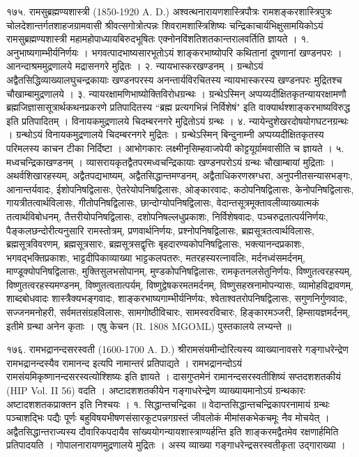 १७५. रामसुब्रह्मण्यशास्त्री (1850-1920 A. D.)
अश्वत्थनारायणशास्त्रिपौत्रः रामशङ्करशास्त्रिपुत्रः चोलदेशान्तर्गतशाहजग्रामवासी श्रीवत्सगोत्रोत्पन्नः शिवरामशास्त्रिशिष्यः चन्द्रिकाचार्यभिक्षुसामयिकोऽयं रामसुब्रह्मण्यशास्त्री महामहोपाध्यायबिरुदभूषितः एक्नोनविंशतिशतकान्तरालवर्तिति ज्ञायते ।
१. अनुभाष्यगाम्भीर्यनिर्णयः । भगवत्पादभाष्यसारभूतोऽयं शाङ्करभाष्योपरि कथितानां दूषणानां खण्डनपरः । आनन्दाश्रममुद्रणालये मद्रासनगरे मुद्रितः ।
२. न्यायभास्करखण्डनम् । ग्रन्थोऽयं अद्वैतसिद्धिव्याख्यालघुचन्द्रकायाः खण्डनपरस्य अनन्तार्यविरचितस्य न्यायभास्करस्य खण्डनपरः मुद्रितश्च चौखाम्बामुद्रणालये ।
३. न्यायरक्षामणिभाष्योक्तिविरोधग्रन्थः । ग्रन्थेऽस्मिन् अप्पय्यदीक्षितकृतन्यायरक्षामणौ ब्रह्मजिज्ञासासूत्रार्थकथनप्रकरणे प्रतिपादितस्य ``ब्रह्म प्रत्यगभिन्नं निर्विशेषं" इति वाक्यार्थश्शाङ्करभाष्यविरुद्ध इति प्रतिपादितम् । विनायकमुद्रणालये चिदम्बरनगरे मुद्रितोऽयं ग्रन्थः ।
४. न्यायेन्दुशेखरदोषयोगघटनग्रन्थः । ग्रन्थोऽयं विनायकमुद्रणालये चिदम्बरनगरे मुद्रितः । ग्रन्थेऽस्मिन् बिन्दुनाम्नी अप्पय्यदीक्षितकृतस्य परिमलस्य काचन टीका निर्दिष्टा । आभोगकारः लक्ष्मीनृसिम्हवाजपेयी कोट्टयूर्ग्रामवासीति च ज्ञायते ।
५. मध्वचन्द्रिकाखण्डनम् । व्यासरायकृतद्वैतपरमध्वचन्द्रिकायाः खण्डनपरोऽयं ग्रन्थः चौखाम्बायां मुद्रिताः ।
अथर्वशिखारहस्यम्, अद्वैतपद्यभाष्यम्, अद्वैतसिद्धान्तमण्डनम्, अद्वैताधिकरणस्रग्धरा, अनुपनीतसन्यासभङ्गः, आनान्तर्यवादः, ईशोपनिषद्विलासः, ऐतरेयोपनिषद्विलासः, ओङ्कारवादः, कठोपनिषद्विलासः, केनोपनिषद्विलासः, गायत्रीतत्वार्थविलासः, गीतोपनिषद्विलासः, छान्दोग्योपनिषद्विलासः, वेदान्तसूत्रमूक्तावलीव्याख्यात्मकं तत्वार्थविबोधनम्, तैत्तरीयोपनिषद्विलासः, दशोपनिषल्लधुप्रकाशः, निर्विशेषवादः, पञ्चरुद्रतात्पर्यनिर्णयः, पैङ्कलछन्दोरीत्यनुसारि रामस्तोत्रम्, प्रणवार्थनिर्णयः, प्रश्नोपनिषद्विलासः, ब्रह्मसूत्रतत्वार्थविलासः, ब्रह्मसूत्रविवरणम्, ब्रह्मसूत्रसारः, ब्रह्मसूत्रसद्वृत्तिः बृहदारण्यकोपनिषद्विलासः, भक्त्यानन्दप्रकाशः, भगवद्भक्तिप्रकाशः, भाट्टदीपिकाव्याख्या भाट्टकलपतरुः, मतरहस्यरत्नावलिः, मर्दनध्वंसमर्दनम्, माण्डूक्योपनिषद्विलासः, मुक्तिसुलभसोपानम्, मुण्डकोपनिषद्विलासः, रामकृतनलसेतुनिर्णयः, विष्णुतत्वरहस्यम्, विष्णुतत्वरहस्यमण्डनम्, विष्णुतत्वतात्पर्यम्, विष्णुद्वेषकरमतमर्दनम्, विष्णुसहस्रनामोपन्यासः, व्यामोहविद्रावणम्, शाब्दबोधवादः शास्त्रैक्यभङ्गवादः, शाङ्करभाष्यगाम्भीर्यनिर्णयः, श्वेताश्वतरोपनिषद्विलासः, सगुणनिर्गुणवादः, सज्जनमनोहरी, सर्वमतसंग्रहविलासः, सामगोष्ठीविचारः, सामस्वरविचारः, हिङ्कारमञ्जरी, हिम्सायज्ञमर्दनम्, इतीमे ग्रन्था अनेन कृताः । एषु केचन (R. 1808 MGOML) पुस्तकालये लभ्यन्ते ॥

१७६. रामभद्रानन्दसरस्वती (1600-1700 A. D.)
श्रीरामसंयमीन्दोरित्यस्य व्याख्यानावसरे गङ्गाधरेन्द्रेण रामभद्रानन्दस्यैव रामानन्द इत्यपि नामान्तरं प्रतिपाद्यते । रामभद्रानन्दोऽयं रामसंयमिकृष्णानन्दसरस्वत्योश्शिष्यः इति ज्ञायते । दासगुप्तमेनं रामानन्दसरस्वतीशिष्यं सप्तदशशतकीयं (HIP Vol. II 56) वदति । अष्टादशशतकीयेन गङ्गाधरेन्द्रेण व्याख्यायमानोऽयं ग्रन्थकारः अष्टादशशतकप्राक्तन इति निश्चयः ।
१. सिद्धान्तचन्द्रिका ॥ वेदान्तसिद्धान्तचन्द्रिकापरनामायं ग्रन्थः पञ्चाशद्भिः पद्यैः पूर्णः बहुविषयभीषणसंसारकूटपन्नगग्रस्तं जीवलोकं मीमांसकभेकचमूः नैव मोचयेत् । अद्वैतसिद्धान्तराज्यस्य दौवारिकपदायैव सांख्ययोगन्यायशास्त्राण्यर्हन्ति इति शाङ्करमद्वैतमेव रक्षणार्हमिति प्रतिपादयति । गोपालनारायणमुद्रणालये मुद्रितः । अस्य व्याख्या गङ्गाधरेन्द्रसरस्वतीकृता उद्गाराख्या ।

